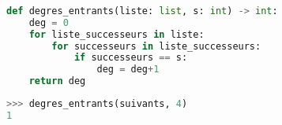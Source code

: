 \documentclass[svgnames,11pt]{beamer}
\begin{document}
\begin{frame}[fragile]
    \frametitle{}

\begin{center}
\begin{lstlisting}[language=Python , basicstyle=\ttfamily\small, xleftmargin=1em, xrightmargin=0em]
def degres_entrants(liste: list, s: int) -> int:
    deg = 0
    for liste_successeurs in liste:
        for successeurs in liste_successeurs:
            if successeurs == s:
                deg = deg+1
    return deg
\end{lstlisting}
\end{center}
\begin{center}
\begin{lstlisting}[language=Python , basicstyle=\ttfamily\small, xleftmargin=2em, xrightmargin=2em]
>>> degres_entrants(suivants, 4)
1
\end{lstlisting}
\label{CODE}
\end{center}
\end{frame}
\end{document}
